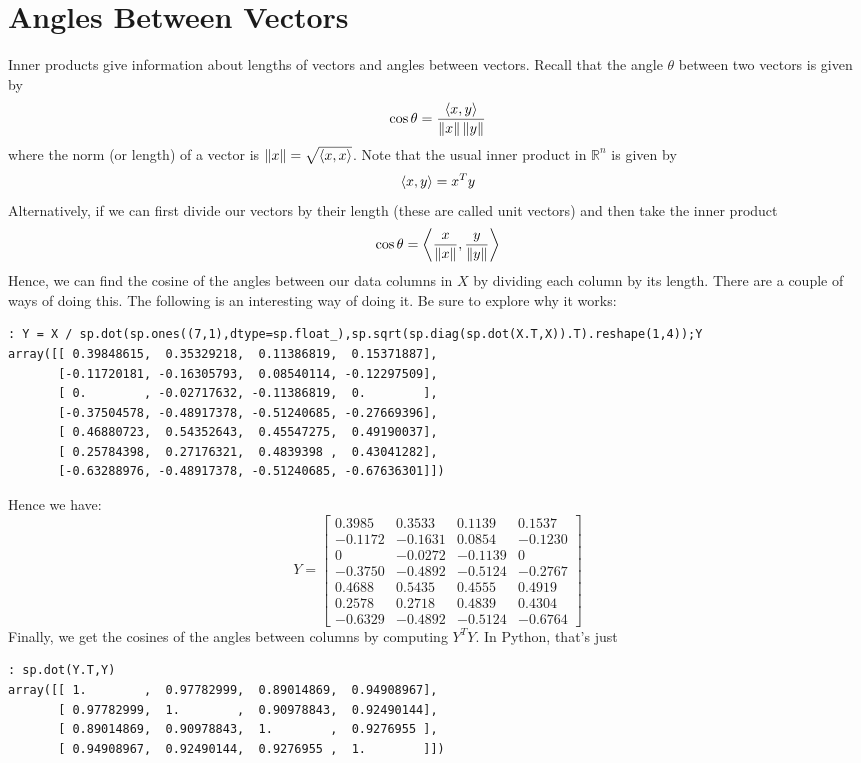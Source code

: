 \section*{Angles Between Vectors}

Inner products give information about lengths of vectors and angles between vectors.  Recall that the angle $\theta$ between two vectors is given by
\[
\cos{\theta} = \frac{\langle x,y \rangle}{\left\lVert x\right\rVert\left\lVert y\right\rVert}
\]
where the norm (or length) of a vector is $\left\lVert x\right\rVert = \sqrt{\langle x,x \rangle}$.  Note that the usual inner product in $\mathbb{R}^n$ is given by
\[
\langle x,y \rangle = x^T y
\]
Alternatively, if we can first divide our vectors by their length (these are called unit vectors) and then take the inner product
\[
\cos{\theta} = \left\langle\frac{x}{\left\lVert x\right\rVert},\frac{y}{\left\lVert y\right\rVert}\right\rangle
\]
Hence, we can find the cosine of the angles between our data columns in $X$ by dividing each column by its length.  There are a couple of ways of doing this.  The following is an interesting way of doing it.  Be sure to explore why it works:
\begin{lstlisting}[style=python]
: Y = X / sp.dot(sp.ones((7,1),dtype=sp.float_),sp.sqrt(sp.diag(sp.dot(X.T,X)).T).reshape(1,4));Y
array([[ 0.39848615,  0.35329218,  0.11386819,  0.15371887],
       [-0.11720181, -0.16305793,  0.08540114, -0.12297509],
       [ 0.        , -0.02717632, -0.11386819,  0.        ],
       [-0.37504578, -0.48917378, -0.51240685, -0.27669396],
       [ 0.46880723,  0.54352643,  0.45547275,  0.49190037],
       [ 0.25784398,  0.27176321,  0.4839398 ,  0.43041282],
       [-0.63288976, -0.48917378, -0.51240685, -0.67636301]])
\end{lstlisting}
Hence we have:
\[
Y=
\begin{bmatrix}
0.3985 & 0.3533 & 0.1139 & 0.1537\\
-0.1172 & -0.1631 & 0.0854 & -0.1230\\
0 &-0.0272 &-0.1139 & 0\\
-0.3750 & -0.4892 & -0.5124 & -0.2767\\
0.4688 & 0.5435 & 0.4555 & 0.4919\\
0.2578 & 0.2718 & 0.4839 & 0.4304\\
-0.6329 & -0.4892 & -0.5124 & -0.6764
\end{bmatrix}
\]
Finally, we get the cosines of the angles between columns by computing $Y^T Y$.  In Python, that's just
\begin{lstlisting}[style=python]
: sp.dot(Y.T,Y)
array([[ 1.        ,  0.97782999,  0.89014869,  0.94908967],
       [ 0.97782999,  1.        ,  0.90978843,  0.92490144],
       [ 0.89014869,  0.90978843,  1.        ,  0.9276955 ],
       [ 0.94908967,  0.92490144,  0.9276955 ,  1.        ]])
\end{lstlisting}
